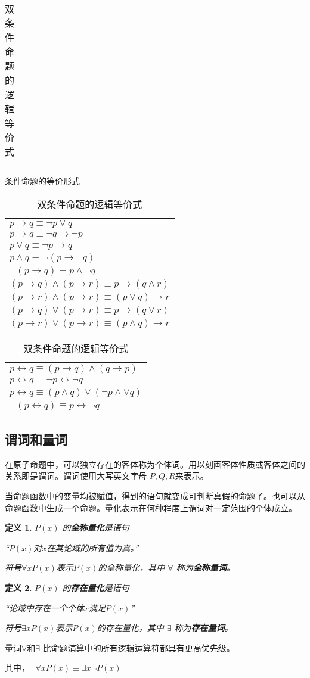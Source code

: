 \documentclass{ctexart}
\newtheorem{definition}{\indent 定义}[section]
\begin{document}
\begin{table}
\begin{tabular}{p{14em}|cp{6em}}
        \hline
    \end{tabular}
    \caption{条件命题的等价形式}
    \begin{tabular}{p{20em}}
        \hline
        $p \rightarrow q \equiv \lnot p \lor q$                         \\
        $p \rightarrow q \equiv \lnot q \rightarrow \lnot p$            \\
        $p \lor q \equiv \lnot p \rightarrow q$                         \\
        $p \land q \equiv \lnot (p \rightarrow \lnot q)$                \\
        $\lnot(p \rightarrow q) \equiv p \land \lnot q$                 \\
        $(p \rightarrow q) \land (p \rightarrow r) \equiv p \rightarrow (q \land r) $ \\
        $(p \rightarrow r) \land (p \rightarrow r) \equiv (p \lor q) \rightarrow  r $ \\
        $(p \rightarrow q) \lor (p \rightarrow r) \equiv p \rightarrow (q \lor r) $ \\
        $(p \rightarrow r) \lor (p \rightarrow r) \equiv (p \land q) \rightarrow  r $ \\
        \hline
    \end{tabular}
    \caption{双条件命题的逻辑等价式}
    \begin{tabular}{p{20em}}
        \hline
        $p \leftrightarrow q \equiv (p \rightarrow q) \land (q \rightarrow p)$  \\
        $p \leftrightarrow q \equiv \lnot p \leftrightarrow \lnot q $           \\
        $p \leftrightarrow q \equiv (p \land q) \lor (\lnot p \land \lor q)$    \\
        $\lnot (p \leftrightarrow q) \equiv p \leftrightarrow \lnot q$          \\
        \hline
    \end{tabular}
\end{table}
\subsection{谓词和量词}
在原子命题中，可以独立存在的客体称为个体词。用以刻画客体性质或客体之间的关系即是谓词。谓词使用大写英文字母 $P,Q,R$来表示。

当命题函数中的变量均被赋值，得到的语句就变成可判断真假的命题了。也可以从命题函数中生成一个命题。量化表示在何种程度上谓词对一定范围的个体成立。
\begin{definition}
    $P(x)$ 的{\bf 全称量化}是语句

    \centerline{“$P(x)$对$x$在其论域的所有值为真。”}
    符号$\forall xP(x)$表示$P(x)$的全称量化，其中 $\forall$ 称为{\bf 全称量词}。
\end{definition}
\begin{definition}
    $P(x)$ 的{\bf 存在量化}是语句

    \centerline{“论域中存在一个个体$x$满足$P(x)$”}
    符号$\exists xP(x)$表示$P(x)$的存在量化，其中 $\exists$ 称为{\bf 存在量词}。
\end{definition}
量词$\forall$和$\exists$ 比命题演算中的所有逻辑运算符都具有更高优先级。

其中，$\lnot \forall xP(x) \equiv \exists x \lnot P(x)$
\end{document}
